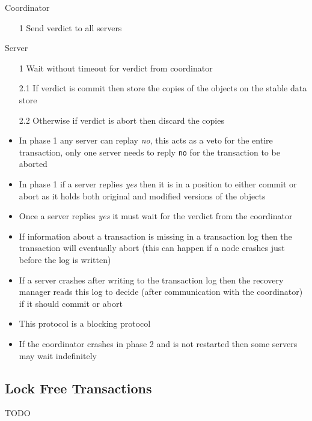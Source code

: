 \documentclass[a4paper]{article}
\begin{document}

\begin{minipage}[t]{0.5\textwidth}
  Coordinator

  \begin{enumerate}
    \item[1] Send verdict to all servers
  \end{enumerate}
\end{minipage}%
\begin{minipage}[t]{0.5\textwidth}
  Server

  \begin{enumerate}
    \item[1]   Wait without timeout for verdict from coordinator
    \item[2.1] If verdict is commit then store the copies of the objects on the
               stable data store
    \item[2.2] Otherwise if verdict is abort then discard the copies
  \end{enumerate}
\end{minipage}


\begin{itemize}
  \item In phase 1 any server can replay \textit{no}, this acts as a veto for
        the entire transaction, only one server needs to reply \texttt{no} for
        the transaction to be aborted
  \item In phase 1 if a server replies \textit{yes} then it is in a position
        to either commit or abort as it holds both original and modified
        versions of the objects
  \item Once a server replies \textit{yes} it must wait for the verdict from
        the coordinator
  \item If information about a transaction is missing in a transaction log then
        the transaction will eventually abort (this can happen if a node crashes
        just before the log is written)
  \item If a server crashes after writing to the transaction log then the
        recovery manager reads this log to decide (after communication with the
        coordinator) if it should commit or abort
  \item This protocol is a blocking protocol
  \item If the coordinator crashes in phase 2 and is not restarted then some
        servers may wait indefinitely
\end{itemize}

\subsection{Lock Free Transactions}

TODO
\end{document}

